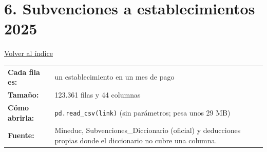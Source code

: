 \documentclass[10.5pt]{article}
\begin{document}
\section*{6. Subvenciones a establecimientos 2025}
\vspace{-6pt}\hfill{\small\hyperlink{indice}{\textcolor{azuloscuro}{\underline{Volver al índice}}}}\par\vspace{2pt}
\begin{tabularx}{\linewidth}{@{}l X@{}}\textbf{Cada fila es:} & un establecimiento en un mes de pago \\\textbf{Tamaño:} & 123.361 filas y 44 columnas \\\textbf{Cómo abrirla:} & \texttt{pd.read\_\allowbreak{}csv(link)} (sin parámetros; pesa unos 29 MB) \\\textbf{Fuente:} & Mineduc, Subvenciones\_Diccionario (oficial) y deducciones propias donde el diccionario no cubre una columna. \\\end{tabularx}
\vspace{6pt}
\end{document}
